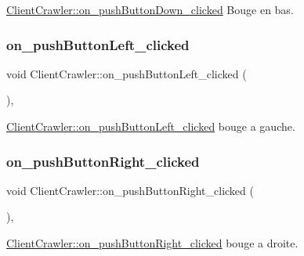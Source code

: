 \hyperlink{class_client_crawler_a3f9ad2ca60a388d5d3d0436af7dd3756}{Client\+Crawler\+::on\+\_\+push\+Button\+Down\+\_\+clicked} Bouge en bas. 

\mbox{\label{class_client_crawler_aadabe491ca10e5499026d3b1b0de99a9}} 
\subsubsection{\texorpdfstring{on\+\_\+push\+Button\+Left\+\_\+clicked}{on\_pushButtonLeft\_clicked}}
{\footnotesize\ttfamily void Client\+Crawler\+::on\+\_\+push\+Button\+Left\+\_\+clicked (\begin{DoxyParamCaption}{ }\end{DoxyParamCaption})\hspace{0.3cm}{\ttfamily [private]}, {\ttfamily [slot]}}



\hyperlink{class_client_crawler_aadabe491ca10e5499026d3b1b0de99a9}{Client\+Crawler\+::on\+\_\+push\+Button\+Left\+\_\+clicked} bouge a gauche. 

\mbox{\label{class_client_crawler_a4deee7315beda4b1c67baf0801512dcc}} 
\subsubsection{\texorpdfstring{on\+\_\+push\+Button\+Right\+\_\+clicked}{on\_pushButtonRight\_clicked}}
{\footnotesize\ttfamily void Client\+Crawler\+::on\+\_\+push\+Button\+Right\+\_\+clicked (\begin{DoxyParamCaption}{ }\end{DoxyParamCaption})\hspace{0.3cm}{\ttfamily [private]}, {\ttfamily [slot]}}



\hyperlink{class_client_crawler_a4deee7315beda4b1c67baf0801512dcc}{Client\+Crawler\+::on\+\_\+push\+Button\+Right\+\_\+clicked} bouge a droite. 

